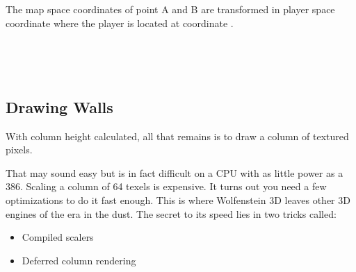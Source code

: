 \par
{}
\par
The map space coordinates of point A and B are transformed in player space coordinate where the player is located at coordinate .\\





 \begin{minipage}{\textwidth}
 
\centering
\vspace*{0.5cm}\\
\centering
\label{fish_eye_corrected}

 \end{minipage}


 \par
 
 \begin{minipage}{\textwidth}
\centering
\vspace*{0.5cm}\\
\centering
 \label{wolf3d_7_fullframe}
\end{minipage}











\subsection{Drawing Walls}
With column height calculated, all that remains is to draw a column of textured pixels.\\
\par
That may sound easy but is in fact difficult on a CPU with as little power as a 386. Scaling a column of 64 texels is expensive. It turns out you need a few optimizations to do it fast enough. This is where Wolfenstein 3D leaves other 3D engines of the era in the dust. The secret to its speed lies in two tricks called:
\begin{itemize}
\item Compiled scalers
\item Deferred column rendering
\end{itemize}
\par








